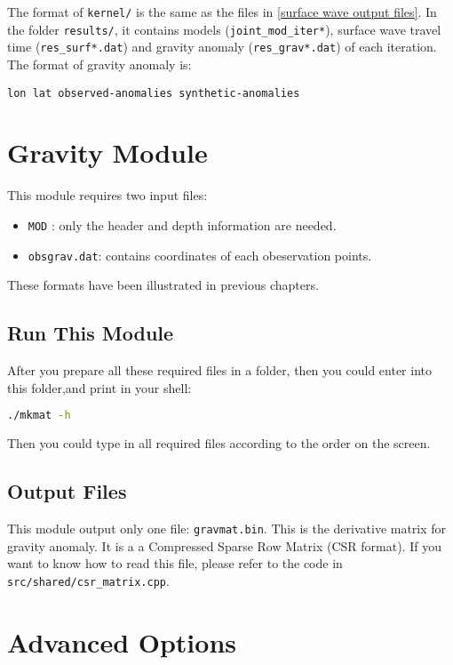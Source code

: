 \documentclass[UTF8]{article}
\begin{document}
The format of \verb!kernel/! is the same as the files
in \ref{surface wave output files}. In the folder \verb!results/!,
it contains models (\verb!joint_mod_iter*!), 
surface wave travel time (\verb!res_surf*.dat!) and 
gravity anomaly (\verb!res_grav*.dat!) 
of each iteration. The format of gravity anomaly is:
\begin{center}
    \texttt{lon lat observed-anomalies synthetic-anomalies}
\end{center}

\section{Gravity Module}
This module requires two input files:
\begin{itemize} 
    \item \texttt{MOD} : only the header and depth information are needed.
    \item \texttt{obsgrav.dat}: contains coordinates of each 
                     obeservation points.
\end{itemize}
These formats have been illustrated in previous chapters.

\subsection{Run This Module}
After you prepare all these required files in a folder,
then you could enter into this folder,and print in your shell:
\begin{lstlisting}[language=bash]
./mkmat -h
\end{lstlisting}
Then you could type in all required files according to 
the order on the screen.

\subsection{Output Files}\label{Gravity Matrix}
This module output only one file: \verb!gravmat.bin!. 
This is the derivative matrix for gravity anomaly. It is a 
a Compressed Sparse Row Matrix (CSR format). If you want to know how to read this file, please refer to the code in \texttt{src/shared/csr\_matrix.cpp}.


\section{Advanced Options}
\end{document}
